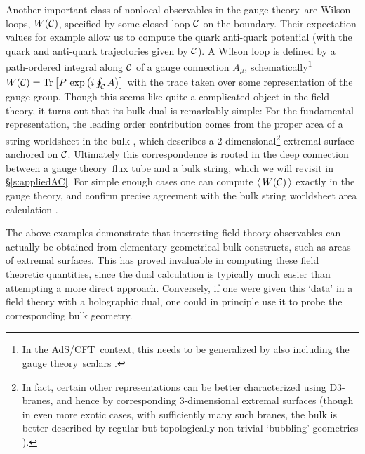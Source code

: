 \documentclass[12pt,a4paper]{article}
\def\sect#1{\S\ref{#1}}
\def\AC{AdS/CFT}
\def\GT{gauge theory}
\def\vev#1{\langle\, #1 \, \rangle}
\begin{document}
Another important class of nonlocal observables in the \GT\ are  Wilson loops, $W({\cal C})$, specified by some closed loop ${\cal C}$ on the boundary.  Their expectation values for example allow us to compute the quark anti-quark potential (with the quark and anti-quark trajectories given by ${\cal C}$).
A Wilson loop is defined by a path-ordered integral along ${\cal C}$ of a gauge connection $A_{\mu}$, schematically\footnote{
In the \AC\ context, this needs to be generalized  by also including the \GT\ scalars \cite{Maldacena:1998im}. 
}
$W({\cal C}) = {\rm Tr} \left[ P \, \exp \left( i \oint_{\cal C} A \right) \right]
$
with the trace taken over some representation of the gauge group.  
Though this seems like quite a complicated object in the field theory, it turns out that its bulk dual is remarkably simple:
For the fundamental representation, the leading order contribution comes from the proper area of a string worldsheet in the bulk \cite{Maldacena:1998im}, which describes a 2-dimensional\footnote{
In fact, certain other representations can be better characterized using D3-branes, and hence by corresponding 3-dimensional extremal surfaces \cite{Drukker:2005kx} (though in even more exotic cases, with sufficiently many such branes, the bulk is better described by regular but topologically non-trivial `bubbling' geometries \cite{Lunin:2006xr}).
} extremal surface anchored on ${\cal C}$.  
Ultimately this correspondence is rooted in the deep connection between a \GT\ flux tube and a bulk string, which we will revisit in \sect{s:appliedAC}.
For simple enough cases one can compute $\vev{W({\cal C})}$ exactly in the \GT, and confirm precise agreement with the bulk string worldsheet area calculation \cite{Drukker:2000rr}.

The above examples demonstrate that interesting field theory observables can actually be obtained from elementary geometrical bulk constructs,  such as areas of extremal surfaces.  This has proved invaluable in computing these field theoretic quantities, since the dual calculation is typically much easier than attempting a more direct approach.  Conversely, if one were given this  `data' in a field theory with a holographic dual, one could in principle use it to probe the corresponding bulk geometry.  
\end{document}
